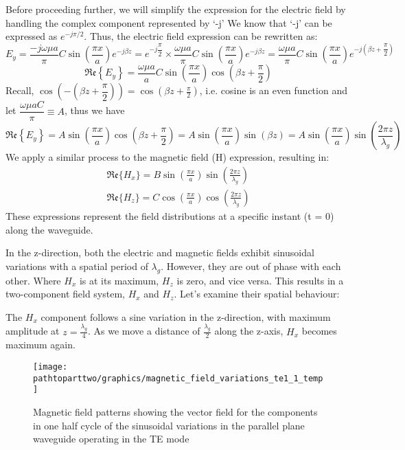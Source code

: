 Before proceeding further, we will simplify the expression for the electric field by handling the complex component represented by `-j' We know that `-j' can be expressed as $e^{-j\pi/2}$. Thus, the electric field expression can be rewritten as:
\begin{dmath*}
E_y = \dfrac{-j\omega\mu a}{\pi}C\sin(\dfrac{\pi x}{a})e^{
-j\beta z}
=e^{-j\dfrac{\pi}{2}}\times\dfrac{\omega \mu a}{\pi}C\sin(\dfrac{\pi x}{a})e^{-j\beta z}
= \dfrac{\omega \mu a}{\pi}C\sin(\dfrac{\pi x}{a})e^{-j\left(\beta z + \dfrac{\pi}{2}\right)
}
\end{dmath*}
\begin{dmath*}
\mathfrak{Re}\left\{E_y\right\} = \dfrac{\omega \mu a}{a}C\sin(\dfrac{\pi x}{a})\cos(\beta z + \dfrac{\pi}{2})
\end{dmath*}
Recall, $\cos(-\left(\beta z + \dfrac{\pi}{2}\right))=\cos(\beta z + \frac{\pi}{2})$, i.e. cosine is an even function and let ${\dfrac{\omega \mu aC}{\pi}\equiv A}$, thus we have 
\begin{dmath*}
\mathfrak{Re}\left\{E_y\right\} = A\sin(\dfrac{\pi x}{a})\cos(\beta z +\dfrac{\pi}{2}) = A\sin(\dfrac{\pi x}{a})\sin(\beta z) = A\sin(\dfrac{\pi x}{a})\sin(\dfrac{2\pi z}{\lambda_g})
\end{dmath*}
We apply a similar process to the magnetic field (H) expression, resulting in:
\begin{align*}
\mathfrak{Re}\{H_x\} = B\sin(\frac{\pi x}{a})\sin(\frac{2\pi z}{\lambda_g})\\
\mathfrak{Re}\{H_z\}= C\cos(\frac{\pi x}{a})\cos(\frac{2\pi z}{\lambda_g})
\end{align*}
These expressions represent the field distributions at a specific instant (t = 0) along the waveguide.

In the z-direction, both the electric and magnetic fields exhibit sinusoidal variations with a spatial period of $\lambda_g$. However, they are out of phase with each other. Where $H_x$ is at its maximum, $H_z$ is zero, and vice versa. This results in a two-component field system, $H_x$ and $H_z$. Let's examine their spatial behaviour:

The $H_x$ component follows a sine variation in the z-direction, with maximum amplitude at $z = \frac{\lambda_g}{4}$. As we move a distance of $\frac{\lambda_g}{2}$ along the z-axis, $H_x$ becomes maximum again. 
\begin{figure}[h]
\centering
\texttt{[image: \\pathtoparttwo/graphics/magnetic\_field\_variations\_te1\_1\_temp]}
\caption{Magnetic field patterns showing the vector field for the components in one half cycle of the sinusoidal variations in the parallel plane waveguide operating in the TE mode}
\label{fig:watson}
\end{figure}

